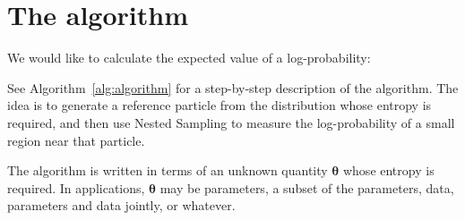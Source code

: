 \documentclass[entropy,article,accept,oneauthor,pdftex,10pt,a4paper]{mdpi}
\newcommand{\x}{\boldsymbol{\theta}}
\begin{document}
\section{The algorithm}

We would like to calculate the expected value of a log-probability:

See Algorithm~\ref{alg:algorithm} for a step-by-step description of the
algorithm. The idea is to generate a reference particle from the distribution
whose entropy is required, and then use Nested Sampling to measure the
log-probability of a small region near that particle.

The algorithm is written in terms of an unknown quantity $\x$
whose entropy is required. In applications, $\x$ may be parameters,
a subset of the parameters, data, parameters and data jointly, or
whatever.
\end{document}
